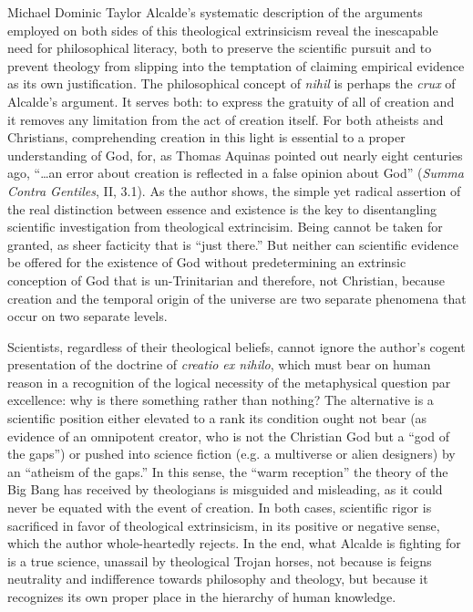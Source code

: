 \begin{recengenv}{Michael Dominic Taylor}
Alcalde's systematic description of the arguments employed on both sides of this theological extrinsicism reveal the inescapable need for philosophical literacy, both to preserve the scientific pursuit and to prevent theology from slipping into the temptation of claiming empirical evidence as its own justification. The philosophical concept of \textit{nihil} is perhaps the \textit{crux} of Alcalde's argument. It serves both: to express the gratuity of all of creation and it removes any limitation from the act of creation itself. For both atheists and Christians, comprehending creation in this light is essential to a proper understanding of God, for, as Thomas Aquinas pointed out nearly eight centuries ago, ``…an error about creation is reflected in a false opinion about God'' (\textit{Summa Contra Gentiles}, II, 3.1). As the author shows, the simple yet radical assertion of the real distinction between essence and existence is the key to disentangling scientific investigation from theological extrincisim. Being cannot be taken for granted, as sheer facticity that is ``just there.'' But neither can scientific evidence be offered for the existence of God without predetermining an extrinsic conception of God that is un-Trinitarian and therefore, not Christian, because creation and the temporal origin of the universe are two separate phenomena that occur on two separate levels.

Scientists, regardless of their theological beliefs, cannot ignore the author's cogent presentation of the doctrine of \textit{creatio ex nihilo}, which must bear on human reason in a recognition of the logical necessity of the metaphysical question par excellence: why is there something rather than nothing? The alternative is a scientific position either elevated to a rank its condition ought not bear (as evidence of an omnipotent creator, who is not the Christian God but a ``god of the gaps'') or pushed into science fiction (e.g. a multiverse or alien designers) by an ``atheism of the gaps.'' In this sense, the ``warm reception'' the theory of the Big Bang has received by theologians is misguided and misleading, as it could never be equated with the event of creation. In both cases, scientific rigor is sacrificed in favor of theological extrinsicism, in its positive or negative sense, which the author whole-heartedly rejects. In the end, what Alcalde is fighting for is a true science, unassail by theological Trojan horses, not because is feigns neutrality and indifference towards philosophy and theology, but because it recognizes its own proper place in the hierarchy of human knowledge.




\end{recengenv}